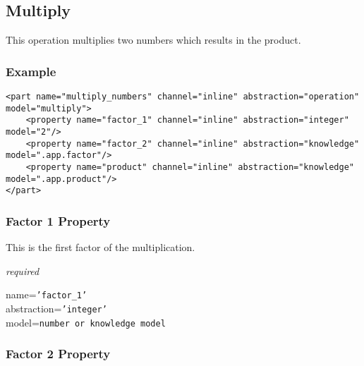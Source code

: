 %
%
%
%
%
%

\subsection{Multiply}
\label{multiply_heading}

This operation multiplies two numbers which results in the product.

\subsubsection{Example}

\begin{scriptsize}
    \begin{verbatim}
<part name="multiply_numbers" channel="inline" abstraction="operation" model="multiply">
    <property name="factor_1" channel="inline" abstraction="integer" model="2"/>
    <property name="factor_2" channel="inline" abstraction="knowledge" model=".app.factor"/>
    <property name="product" channel="inline" abstraction="knowledge" model=".app.product"/>
</part>
    \end{verbatim}
\end{scriptsize}

\subsubsection{Factor 1 Property}

This is the first factor of the multiplication.

\emph{required}

name=\texttt{'factor\_1'}\\
abstraction=\texttt{'integer'}\\
model=\texttt{number or knowledge model}

\subsubsection{Factor 2 Property}

